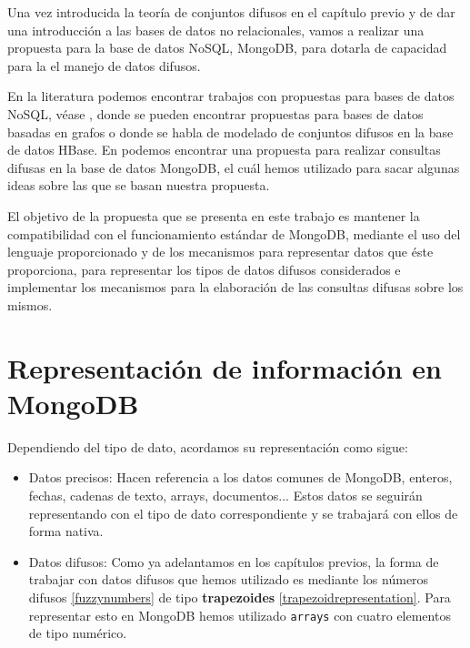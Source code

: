 \label{propuesta}
Una vez introducida la teoría de conjuntos difusos en el capítulo previo y de dar una introducción a las bases de datos no relacionales, vamos a realizar una propuesta para la base de datos NoSQL, MongoDB, para dotarla de capacidad para la el manejo de datos difusos.

En la literatura podemos encontrar trabajos con propuestas para bases de datos NoSQL, véase \cite{fuzzyquerygraph, fuzzyquerygraph2, fuzzyquerygraph3}, donde se pueden encontrar propuestas para bases de datos basadas en grafos o \cite{fuzzyqueryhbase} donde se habla de modelado de conjuntos difusos en la base de datos HBase. En \cite{fuzzyquerymongo} podemos encontrar una propuesta para realizar consultas difusas en la base de datos MongoDB, el cuál hemos utilizado para sacar algunas ideas sobre las que se basan nuestra propuesta.

El objetivo de la propuesta que se presenta en este trabajo es mantener la compatibilidad con el funcionamiento estándar de MongoDB, mediante el uso del lenguaje proporcionado y de los mecanismos para representar datos que éste proporciona, para representar los tipos de datos difusos considerados e implementar los mecanismos para la elaboración de las consultas difusas sobre los mismos.

\section{Representación de información en MongoDB}

Dependiendo del tipo de dato, acordamos su representación como sigue:

\begin{itemize}
    \item Datos precisos: Hacen referencia a los datos comunes de MongoDB, enteros, fechas, cadenas de texto, arrays, documentos... Estos datos se seguirán representando con el tipo de dato correspondiente y se trabajará con ellos de forma nativa.
    \item Datos difusos: Como ya adelantamos en los capítulos previos, la forma de trabajar con datos difusos que hemos utilizado es mediante los números difusos \ref{fuzzynumbers} de tipo \textbf{trapezoides} \ref{trapezoidrepresentation}. Para representar esto en MongoDB hemos utilizado \texttt{arrays} con cuatro elementos de tipo numérico.
\end{itemize}

